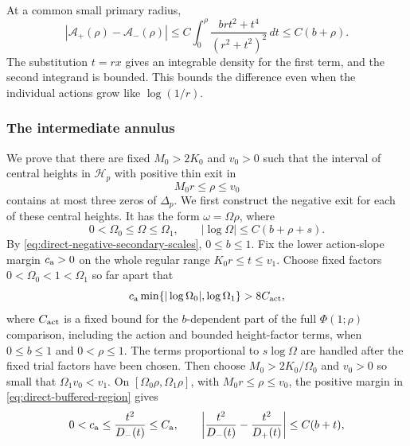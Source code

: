 At a common small primary radius,
\begin{equation}
\label{eq:direct-buffered-action-difference}
 |\mathcal A_+(\rho)-\mathcal A_-(\rho)|
 \le C\int_0^\rho
          \frac{brt^2+t^4}{(r^2+t^2)^2}\,dt
 \le C(b+\rho).
\end{equation}
The substitution \(t=rx\) gives an integrable density for the first
term, and the second integrand is bounded. This bounds the difference
even when the individual actions grow like \(\log(1/r)\).

\subsubsection{The intermediate annulus}

We prove that there are fixed \(M_0>2K_0\) and \(v_0>0\) such that the
interval of central heights in \(\mathcal H_p\) with positive thin exit in
\begin{equation}
\label{eq:direct-buffered-intermediate}
 M_0r\le\rho\le v_0
\end{equation}
contains at most three zeros of \(\Delta_p\).
We first construct the negative exit for each of these central heights.
It has the form \(\omega=\Omega\rho\), where
\begin{equation}
\label{eq:direct-buffered-comparable}
 0<\Omega_0\le\Omega\le\Omega_1,\qquad
 |\log\Omega|\le C(b+\rho+s).
\end{equation}
By \eqref{eq:direct-negative-secondary-scales}, \(0\le b\le1\).
Fix the lower action-slope
margin \(c_{\rm a}>0\) on the whole regular range
\(K_0r\le t\le v_1\).  Choose fixed factors
\(0<\Omega_0<1<\Omega_1\) so far apart that
\begin{equation}
\label{eq:direct-buffered-trial-separation}
 c_{\rm a}\min\{|\log\Omega_0|,\log\Omega_1\}>8C_{\rm act},
\end{equation}
where \(C_{\rm act}\) is a fixed bound for the \(b\)-dependent part of the
full \(\Phi(1;\rho)\) comparison, including the action and bounded
height-factor terms, when \(0\le b\le1\) and \(0<\rho\le1\).
The terms proportional to \(s\log\Omega\) are handled after the fixed
trial factors have been chosen.
Then choose \(M_0>2K_0/\Omega_0\) and \(v_0>0\) so small
that \(\Omega_1v_0<v_1\).  On
\([\Omega_0\rho,\Omega_1\rho]\), with \(M_0r\le\rho\le v_0\),
the positive margin in \eqref{eq:direct-buffered-region} gives
\begin{equation}
\label{eq:direct-buffered-negative-action-slope}
 0<c_{\rm a}\le
 \frac{t^2}{D_-(t)}\le C_{\rm a},\qquad
 \left|\frac{t^2}{D_-(t)}-\frac{t^2}{D_+(t)}\right|\le C(b+t),
\end{equation}
